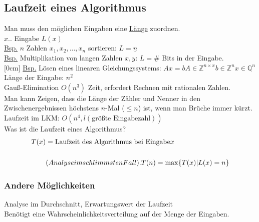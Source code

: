 \subsection{Laufzeit eines Algorithmus}
Man muss den möglichen Eingaben eine \underline{Länge} zuordnen.\\
$x$.. Eingabe $L(x)$\\
\underline{Bsp.} $n$ Zahlen $x_1,x_2,...,x_n$ sortieren: $L = \underline{n}$\\
\underline{Bsp.} Multiplikation von langen Zahlen $x,y$: $L = \#$ Bits in der Eingabe.\\
[0cm]
\underline{Bsp.} Lösen eines linearen Gleichungssystems: $A x = b A \in \mathbb{Z}^{n\times x} b \in \mathbb{Z}^n x\in \mathbb{Q}^n$\\
Länge der Eingabe: $n^2$\\
Gauß-Elimination $O(n^3)$ Zeit, erfordert Rechnen mit rationalen Zahlen.\\
Man kann Zeigen, dass die Länge der Zähler und Nenner in den Zwischenergebnissen höchstens $n$-Mal ($\leq n$) ist, wenn man Brüche immer kürzt.\\
Laufzeit im LKM: $O(n^4, l(\text{größte Eingabezahl}))$\\

Was ist die Laufzeit eines Algorithmus?\\
\begin{align*}
T(x) &= \text{Laufzeit des Algorithmus bei Eingabe} x\\
\\
& \text(Analyse im schlimmsten Fall).
T(n) = \max \{T(x) | L(x) = n \}
\end{align*}
\subsubsection*{Andere Möglichkeiten}
Analyse im Durchschnitt, Erwartungswert der Laufzeit\\
Benötigt eine Wahrscheinlichkeitsverteilung auf der Menge der Eingaben.\\

